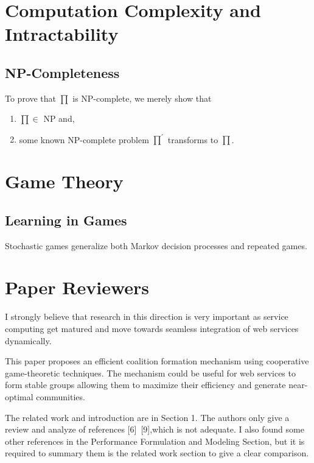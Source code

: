 \documentclass{article}
\begin{document}
\section{Computation Complexity and Intractability}

\subsection{NP-Completeness}

To prove that $\prod$ is NP-complete, we merely show that \cite{Garey:1990:CIG:574848}

\begin{enumerate}
\item $\prod \in$ NP and,
\item some known NP-complete problem $\prod^\prime$ transforms to $\prod$.
\end{enumerate}

\section{Game Theory}

\subsection{Learning in Games}
Stochastic games generalize both Markov decision processes and repeated games.

\section{Paper Reviewers}
I strongly believe that research in this direction is very important as service computing get matured and move towards seamless integration of web services dynamically.

This paper proposes an efficient coalition formation mechanism using cooperative game-theoretic techniques. The mechanism could be useful for web services to form stable groups allowing them to maximize their efficiency and generate near-optimal communities.

The related work and introduction are in Section 1. The authors only give a review and analyze of references [6]~[9],which is not adequate. I also found some other references in the Performance Formulation and Modeling Section, but it is required to summary them is the related work section to give a clear comparison.



\end{document}
